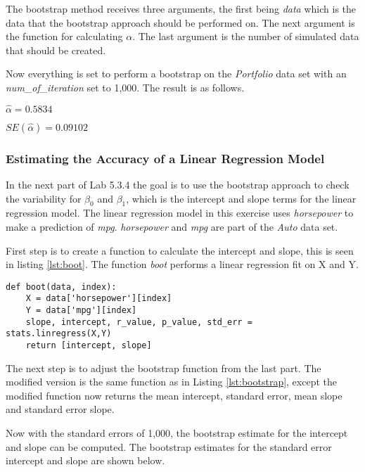 The bootstrap method receives three arguments, the first being \emph{data} which is the data that the bootstrap approach should be performed on. The next argument is the function for calculating $\alpha$. The last argument is the number of simulated data that should be created.  

Now everything is set to perform a bootstrap on the \emph{Portfolio} data set with an \emph{num\_of\_iteration} set to 1,000. The result is as follows.

\begin{center}
	$\hat{\alpha} = 0.5834$
\end{center}

\begin{center}
	$SE(\hat{\alpha}) = 0.09102$
\end{center}


\subsubsection{Estimating the Accuracy of a Linear Regression Model}

In the next part of Lab 5.3.4 the goal is to use the bootstrap approach to check the variability for $\beta_0$ and $\beta_1$, which is the intercept and slope terms for the linear regression model. The linear regression model in this exercise uses \emph{horsepower} to make a prediction of \emph{mpg}. \emph{horsepower} and \emph{mpg} are part of the \emph{Auto} data set.

First step is to create a function to calculate the intercept and slope, this is seen in listing \ref{lst:boot}. The function \emph{boot} performs a linear regression fit on X and Y. 
\newpage
\begin{lstlisting}[caption={Boot function in python}, label=lst:boot, mathescape=true]
def boot(data, index):
	X = data['horsepower'][index]
	Y = data['mpg'][index]
	slope, intercept, r_value, p_value, std_err = stats.linregress(X,Y)
	return [intercept, slope]
\end{lstlisting}

The next step is to adjust the bootstrap function from the last part. The modified version is the same function as in Listing \ref{lst:bootstrap}, except the modified function now returns the mean intercept, standard error, mean slope and standard error slope.

Now with the standard errors of 1,000, the bootstrap estimate for the intercept and slope can be computed.
The bootstrap estimates for the standard error intercept and slope are shown below.

